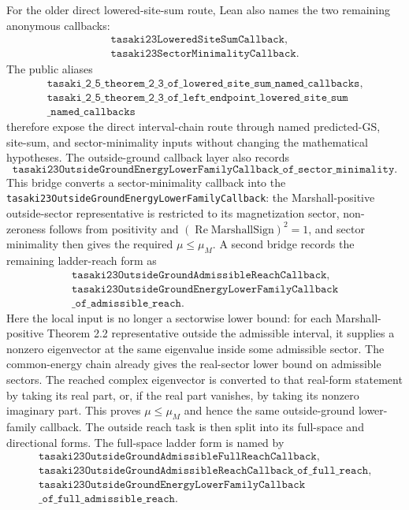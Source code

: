 \documentclass[a4paper,11pt]{article}
\begin{document}
For the older direct lowered-site-sum route, Lean also names the two
remaining anonymous callbacks:
\[
\begin{gathered}
\texttt{tasaki23LoweredSiteSumCallback},\\
\texttt{tasaki23SectorMinimalityCallback}.
\end{gathered}
\]
The public aliases
\[
\begin{gathered}
\texttt{tasaki\_2\_5\_theorem\_2\_3\_of\_lowered\_site\_sum\_named\_callbacks},\\
\texttt{tasaki\_2\_5\_theorem\_2\_3\_of\_left\_endpoint\_lowered\_site\_sum}\\
\texttt{\_named\_callbacks}
\end{gathered}
\]
therefore expose the direct interval-chain route through named
predicted-GS, site-sum, and sector-minimality inputs without changing
the mathematical hypotheses.  The outside-ground callback layer also records
\[
\texttt{tasaki23OutsideGroundEnergyLowerFamilyCallback\_of\_sector\_minimality}.
\]
This bridge converts a sector-minimality callback into the
\texttt{tasaki23OutsideGroundEnergyLowerFamilyCallback}: the
Marshall-positive outside-sector representative is restricted to its
magnetization sector, non-zeroness follows from positivity and
\((\operatorname{Re}\mathrm{MarshallSign})^2=1\), and sector minimality
then gives the required \(\mu\le\mu_M\).  A second bridge records the
remaining ladder-reach form as
\[
\begin{gathered}
\texttt{tasaki23OutsideGroundAdmissibleReachCallback},\\
\texttt{tasaki23OutsideGroundEnergyLowerFamilyCallback}\\
\texttt{\_of\_admissible\_reach}.
\end{gathered}
\]
Here the local input is no longer a sectorwise lower bound: for each
Marshall-positive Theorem 2.2 representative outside the admissible
interval, it supplies a nonzero eigenvector at the same eigenvalue
inside some admissible sector.  The common-energy chain already gives
the real-sector lower bound on admissible sectors.  The reached complex
eigenvector is converted to that real-form statement by taking its real
part, or, if the real part vanishes, by taking its nonzero imaginary
part.  This proves \(\mu\le\mu_M\) and hence the same outside-ground
lower-family callback.  The outside reach task is then split into its
full-space and directional forms.  The full-space ladder form is named by
\[
\begin{gathered}
\texttt{tasaki23OutsideGroundAdmissibleFullReachCallback},\\
\texttt{tasaki23OutsideGroundAdmissibleReachCallback\_of\_full\_reach},\\
\texttt{tasaki23OutsideGroundEnergyLowerFamilyCallback}\\
\texttt{\_of\_full\_admissible\_reach}.
\end{gathered}
\]
\end{document}
